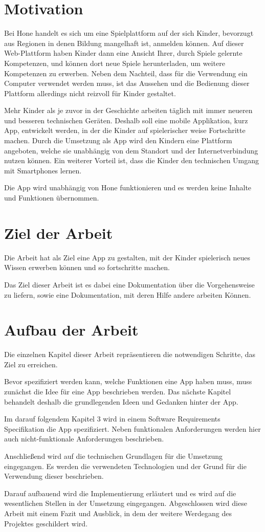 \section{Motivation}
Bei Hone handelt es sich um eine Spielplattform auf der sich Kinder, bevorzugt aus Regionen in denen Bildung mangelhaft ist, anmelden können. Auf dieser Web-Plattform haben Kinder dann eine Ansicht Ihrer, durch Spiele gelernte Kompetenzen, und können dort neue Spiele herunterladen, um weitere Kompetenzen zu erwerben. Neben dem Nachteil, dass für die Verwendung ein Computer verwendet werden muss, ist das Aussehen und die Bedienung dieser Plattform allerdings nicht reizvoll für Kinder gestaltet. 

Mehr Kinder als je zuvor in der Geschichte arbeiten täglich mit immer neueren und besseren technischen Geräten. Deshalb soll eine mobile Applikation, kurz App, entwickelt werden, in der die Kinder auf spielerischer weise Fortschritte machen. Durch die Umsetzung als App wird den Kindern eine Plattform angeboten, welche sie unabhängig von dem Standort und der Internetverbindung nutzen können. Ein weiterer Vorteil ist, dass die Kinder den technischen Umgang mit Smartphones lernen.

Die App wird unabhängig von Hone funktionieren und es werden keine Inhalte und Funktionen übernommen.

\section{Ziel der Arbeit}

Die Arbeit hat als Ziel eine App zu gestalten, mit der Kinder spielerisch neues Wissen erwerben können und so fortschritte machen. 

Das Ziel dieser Arbeit ist es dabei eine Dokumentation über die Vorgehensweise zu liefern, sowie eine Dokumentation, mit deren Hilfe andere arbeiten Können.

\section{Aufbau der Arbeit}

Die einzelnen Kapitel dieser Arbeit repräsentieren die notwendigen Schritte, das Ziel zu erreichen.

Bevor spezifiziert werden kann, welche Funktionen eine App haben muss, muss zunächst die Idee für eine App beschrieben werden. Das nächste Kapitel behandelt deshalb die grundlegenden Ideen und Gedanken hinter der App.

Im darauf folgendem Kapitel 3 wird in einem Software Requirements Specifikation die App spezifiziert. Neben funktionalen Anforderungen werden hier auch nicht-funktionale Anforderungen beschrieben. 

Anschließend wird auf die technischen Grundlagen für die Umsetzung eingegangen. Es werden die verwendeten Technologien und der Grund für die Verwendung dieser beschrieben. 

Darauf aufbauend wird die Implementierung erläutert und es wird auf die wesentlichen Stellen in der Umsetzung eingegangen. Abgeschlossen wird diese Arbeit mit einem Fazit und Ausblick, in dem der weitere Werdegang des Projektes geschildert wird.